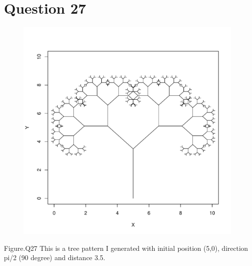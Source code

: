 \documentclass[12pt,a4paper]{article}
\begin{document}
\newpage
\section{Question 27}
\begin{figure}[h]
\centering
\includegraphics[width=\textwidth]{Q27Plot.pdf}
\end{figure}
Figure.Q27 This is a tree pattern I generated with initial position (5,0), direction pi/2 (90 degree) and distance 3.5.

\newpage
\end{document}
